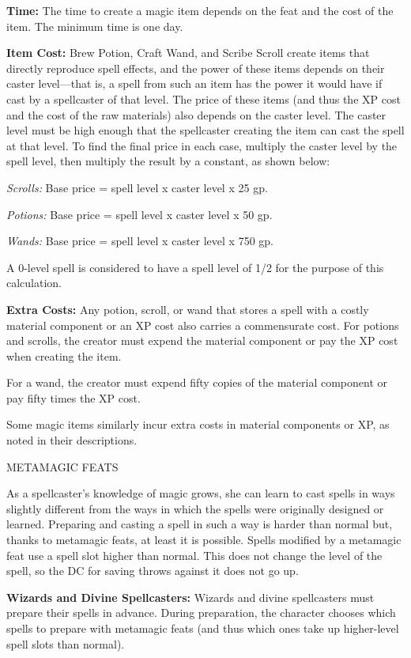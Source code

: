 \documentclass{article}
\begin{document}
\textbf{Time:} The time to create a magic item depends on the feat and the cost 
of the item. The minimum time is one day.

\textbf{Item Cost:} Brew Potion, Craft Wand, and Scribe Scroll create items that 
directly reproduce spell effects, and the power of these items depends on their 
caster level---that is, a spell from such an item has the power it would have if 
cast by a spellcaster of that level. The price of these items (and thus the XP 
cost and the cost of the raw materials) also depends on the caster level. The caster 
level must be high enough that the spellcaster creating the item can cast the spell 
at that level. To find the final price in each case, multiply the caster level 
by the spell level, then multiply the result by a constant, as shown below:

\textit{Scrolls: }Base price = spell level x caster level x $ $25 gp.

\textit{Potions: }Base price = spell level x $ $caster level x $ $50 gp.

\textit{Wands: }Base price = spell level x $ $caster level x $ $750 gp.

A 0-level spell is considered to have a spell level of 1/2 for the purpose of this 
calculation.

\textbf{Extra Costs: }Any potion, scroll, or wand that stores a spell with a costly 
material component or an XP cost also carries a commensurate cost. For potions 
and scrolls, the creator must expend the material component or pay the XP cost 
when creating the item.

For a wand, the creator must expend fifty copies of the material component or pay 
fifty times the XP cost.

Some magic items similarly incur extra costs in material components or XP, as noted 
in their descriptions.

\vspace{12pt}
METAMAGIC FEATS

As a spellcaster's knowledge of magic grows, she can learn to cast spells in ways 
slightly different from the ways in which the spells were originally designed or 
learned. Preparing and casting a spell in such a way is harder than normal but, 
thanks to metamagic feats, at least it is possible.  Spells modified by a metamagic 
feat use a spell slot higher than normal. This does not change the level of the 
spell, so the DC for saving throws against it does not go up.

\textbf{Wizards and Divine Spellcasters:} Wizards and divine spellcasters must 
prepare their spells in advance. During preparation, the character chooses which 
spells to prepare with metamagic feats (and thus which ones take up higher-level 
spell slots than normal).
\end{document}
